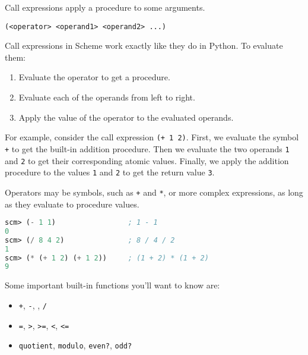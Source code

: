 Call expressions apply a procedure to some arguments.

\centerline{\lstinline{(<operator> <operand1> <operand2> ...)}}

Call expressions in Scheme work exactly like they do in Python. To evaluate
them:
\begin{enumerate}
\item Evaluate the operator to get a procedure.
\item Evaluate each of the operands from left to right.
\item Apply the value of the operator to the evaluated operands.
\end{enumerate}

For example, consider the call expression \texttt{(+ 1 2)}. First, we evaluate
the symbol \texttt{+} to get the built-in addition procedure. Then we evaluate
the two operands \texttt{1} and \texttt{2} to get their corresponding atomic
values. Finally, we apply the addition procedure to the values \texttt{1} and
\texttt{2} to get the return value \texttt{3}.

Operators may be symbols, such as \lstinline$+$ and \lstinline$*$, or more
complex expressions, as long as they evaluate to procedure values.

\begin{lstlisting}[language=Scheme]
scm> (- 1 1)                 ; 1 - 1
0
scm> (/ 8 4 2)               ; 8 / 4 / 2
1
scm> (* (+ 1 2) (+ 1 2))     ; (1 + 2) * (1 + 2)
9
\end{lstlisting}

Some important built-in functions you'll want to know are:
\begin{itemize}
\item {\tt +}, {\tt -}, {\tt *}, {\tt /}
\item {\tt =}, {\tt >}, {\tt >=}, {\tt <}, {\tt <=}
\item {\tt quotient}, {\tt modulo}, {\tt even?}, {\tt odd?}
\end{itemize}
